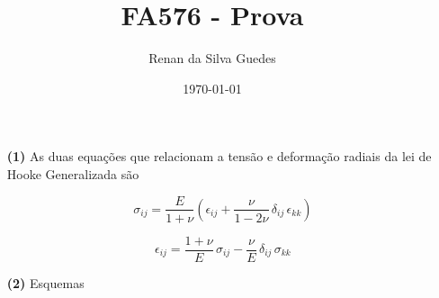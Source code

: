 \documentclass[a4paper, 12pt]{article}
\title{FA576 - Prova}
\author{Renan da Silva Guedes}
\date{\today}
\begin{document}
	\maketitle
	\begin{itemize}
		\item[\textbf{(1)}] As duas equações que relacionam a tensão e deformação radiais da lei de Hooke Generalizada são
		
		\begin{equation}
			\sigma_{ij}=\dfrac{E}{1+\nu}\left(\epsilon_{ij}+\dfrac{\nu}{1-2\nu}\,\delta_{ij}\,\epsilon_{kk}\right)
		\end{equation}
		
		\begin{equation}
			\epsilon_{ij}=\dfrac{1+\nu}{E}\,\sigma_{ij}-\dfrac{\nu}{E}\,\delta_{ij}\,\sigma_{kk}
		\end{equation}
		
		\item[\textbf{(2)}] Esquemas
		

\end{itemize}
\end{document}
